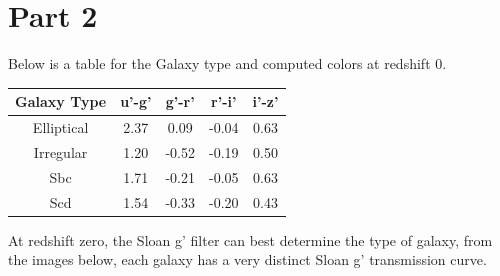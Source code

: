 \documentclass[12pt]{article}
\begin{document}
\section{Part 2}
Below is a table for the Galaxy type and computed colors at redshift 0. 
\begin{center}
 \begin{tabular}{||c c c c c||} 
 \hline
 Galaxy Type & u'-g' & g'-r' & r'-i' & i'-z' \\ [0.5ex] 
 \hline\hline
 Elliptical & 2.37 & 0.09 & -0.04 & 0.63 \\ 
 \hline
 Irregular & 1.20 & -0.52 & -0.19 & 0.50 \\
 \hline
 Sbc & 1.71 & -0.21 & -0.05 & 0.63\\
 \hline
 Scd & 1.54 & -0.33 & -0.20 & 0.43 \\
 \hline
\end{tabular}
\end{center}

At redshift zero, the Sloan g' filter can best determine the type of galaxy, from the images below, each galaxy has a very distinct Sloan g' transmission curve. 
\end{document}
